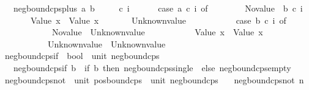 \begin{isabellebody}
\ \ \ {\isachardoublequoteopen}neg{\isacharunderscore}{\kern0pt}bound{\isacharunderscore}{\kern0pt}cps{\isacharunderscore}{\kern0pt}plus\ a\ b\ {\isacharequal}{\kern0pt}\isanewline
\ \ \ \ {\isacharparenleft}{\kern0pt}{\isasymlambda}c\ i{\isachardot}{\kern0pt}\isanewline
\ \ \ \ \ \ case\ a\ c\ i\ of\isanewline
\ \ \ \ \ \ \ \ No{\isacharunderscore}{\kern0pt}value\ {\isasymRightarrow}\ b\ c\ i\isanewline
\ \ \ \ \ \ {\isacharbar}{\kern0pt}\ Value\ x\ {\isasymRightarrow}\ Value\ x\isanewline
\ \ \ \ \ \ {\isacharbar}{\kern0pt}\ Unknown{\isacharunderscore}{\kern0pt}value\ {\isasymRightarrow}\isanewline
\ \ \ \ \ \ \ \ \ \ {\isacharparenleft}{\kern0pt}case\ b\ c\ i\ of\isanewline
\ \ \ \ \ \ \ \ \ \ \ \ No{\isacharunderscore}{\kern0pt}value\ {\isasymRightarrow}\ Unknown{\isacharunderscore}{\kern0pt}value\isanewline
\ \ \ \ \ \ \ \ \ \ {\isacharbar}{\kern0pt}\ Value\ x\ {\isasymRightarrow}\ Value\ x\isanewline
\ \ \ \ \ \ \ \ \ \ {\isacharbar}{\kern0pt}\ Unknown{\isacharunderscore}{\kern0pt}value\ {\isasymRightarrow}\ Unknown{\isacharunderscore}{\kern0pt}value{\isacharparenright}{\kern0pt}{\isacharparenright}{\kern0pt}{\isachardoublequoteclose}\isanewline
\isanewline
{}\isamarkupfalse%
\ neg{\isacharunderscore}{\kern0pt}bound{\isacharunderscore}{\kern0pt}cps{\isacharunderscore}{\kern0pt}if\ {\isacharcolon}{\kern0pt}{\isacharcolon}{\kern0pt}\ {\isachardoublequoteopen}bool\ {\isasymRightarrow}\ unit\ neg{\isacharunderscore}{\kern0pt}bound{\isacharunderscore}{\kern0pt}cps{\isachardoublequoteclose}\isanewline
\ \ \ {\isachardoublequoteopen}neg{\isacharunderscore}{\kern0pt}bound{\isacharunderscore}{\kern0pt}cps{\isacharunderscore}{\kern0pt}if\ b\ {\isacharequal}{\kern0pt}\ {\isacharparenleft}{\kern0pt}if\ b\ then\ neg{\isacharunderscore}{\kern0pt}bound{\isacharunderscore}{\kern0pt}cps{\isacharunderscore}{\kern0pt}single\ {\isacharparenleft}{\kern0pt}{\isacharparenright}{\kern0pt}\ else\ neg{\isacharunderscore}{\kern0pt}bound{\isacharunderscore}{\kern0pt}cps{\isacharunderscore}{\kern0pt}empty{\isacharparenright}{\kern0pt}{\isachardoublequoteclose}\isanewline
\isanewline
{}\isamarkupfalse%
\ neg{\isacharunderscore}{\kern0pt}bound{\isacharunderscore}{\kern0pt}cps{\isacharunderscore}{\kern0pt}not\ {\isacharcolon}{\kern0pt}{\isacharcolon}{\kern0pt}\ {\isachardoublequoteopen}unit\ pos{\isacharunderscore}{\kern0pt}bound{\isacharunderscore}{\kern0pt}cps\ {\isasymRightarrow}\ unit\ neg{\isacharunderscore}{\kern0pt}bound{\isacharunderscore}{\kern0pt}cps{\isachardoublequoteclose}\isanewline
\ \ \ {\isachardoublequoteopen}neg{\isacharunderscore}{\kern0pt}bound{\isacharunderscore}{\kern0pt}cps{\isacharunderscore}{\kern0pt}not\ n\ {\isacharequal}{\kern0pt}\isanewline

\end{isabellebody}
